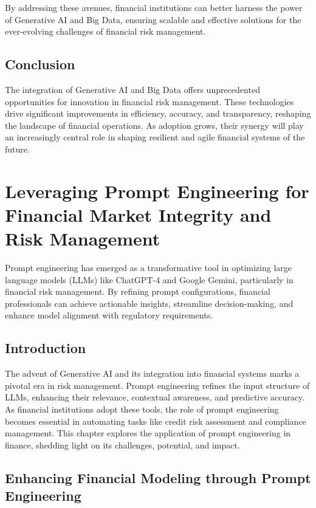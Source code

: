 \documentclass[a4paper,headinclude=on,footinclude=on,12pt,oneside]{scrbook}
\begin{document}
By addressing these avenues, financial institutions can better harness the power of Generative AI and Big Data, ensuring scalable and effective solutions for the ever-evolving challenges of financial risk management.

\section{Conclusion}
The integration of Generative AI and Big Data offers unprecedented opportunities for innovation in financial risk management. These technologies drive significant improvements in efficiency, accuracy, and transparency, reshaping the landscape of financial operations. As adoption grows, their synergy will play an increasingly central role in shaping resilient and agile financial systems of the future.

\chapter{Leveraging Prompt Engineering for Financial Market Integrity and Risk Management}

Prompt engineering has emerged as a transformative tool in optimizing large language models (LLMs) like ChatGPT-4 and Google Gemini, particularly in financial risk management. By refining prompt configurations, financial professionals can achieve actionable insights, streamline decision-making, and enhance model alignment with regulatory requirements.

\section{Introduction}
The advent of Generative AI and its integration into financial systems marks a pivotal era in risk management. Prompt engineering refines the input structure of LLMs, enhancing their relevance, contextual awareness, and predictive accuracy. As financial institutions adopt these tools, the role of prompt engineering becomes essential in automating tasks like credit risk assessment and compliance management. This chapter explores the application of prompt engineering in finance, shedding light on its challenges, potential, and impact.

\section{Enhancing Financial Modeling through Prompt Engineering}
\end{document}
